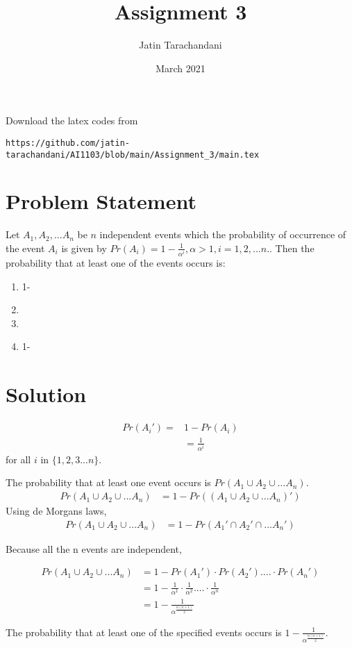 \documentclass[twocolumn]{article}
\title{Assignment 3}
\author{Jatin Tarachandani}
\date{March 2021}
\providecommand{\brak}[1]{\ensuremath{\left(#1\right)}}
\theoremstyle{remark}
\numberwithin{equation}{subsection}
\begin{document}
\maketitle
Download the latex codes from 
\begin{lstlisting}
https://github.com/jatin-tarachandani/AI1103/blob/main/Assignment_3/main.tex
\end{lstlisting}
\section{Problem Statement}
Let $A_1, A_2,... A_n$ be $n$ independent events which the probability of occurrence of the event $A_i$ is given by $Pr\brak{A_i} = 1- \frac{1}{\alpha^i},\alpha>1, i=1,2,...n.$. Then the probability that at least one of the events occurs is: 
\begin{enumerate}
\item 1-

\item {}

\item {}

\item 1- 
    
\end{enumerate}

\section{Solution}
\begin{align}
    Pr\brak{A_i'}=&1-Pr\brak{A_i}\\
    &=\frac{1}{\alpha^i}
\end{align}
for all $i$ in $\{1,2,3...n\}$.

The probability that at least one event occurs is $Pr\brak{A_1 \cup A_2\cup ... A_n}$.
\begin{align}
Pr\brak{A_1 \cup A_2\cup ... A_n}&=1-Pr\brak{(A_1 \cup A_2 \cup ... A_n)'}
\end{align}
Using de Morgans laws, 
\begin{align}
Pr\brak{A_1 \cup A_2\cup ... A_n}&=1-Pr\brak{A_1'\cap A_2' \cap ...A_n'}
\end{align}

Because all the n events are independent,

\begin{align}
Pr\brak{A_1 \cup A_2\cup ... A_n}&=1-Pr\brak{A_1'}\cdot Pr\brak{A_2'}....\cdot Pr\brak{A_n'}\\
&=1-\frac{1}{\alpha^1}\cdot\frac{1}{\alpha^2}....\cdot\frac{1}{\alpha^n}\\
&=1-\frac{1}{\alpha^{\frac{n(n+1)}{2}}}
\end{align}

The probability that at least one of the specified events occurs is $1-\frac{1}{\alpha^{\frac{n(n+1)}{2}}}$.
\end{document}
